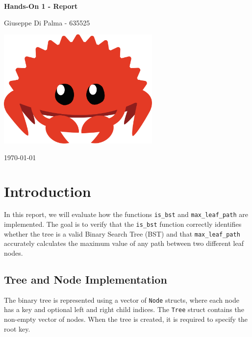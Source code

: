 \documentclass[a4paper,12pt]{article}
\begin{document}
\begin{titlepage}
    \centering
    \vspace*{1cm} 

    \Huge 
    \textbf{Hands-On 1 - Report} 

    \vspace{0.5cm} 

    \Large 
    Giuseppe Di Palma - 635525

    \vfill 

    \includegraphics[width=0.6\textwidth]{images/Cuddlyferris.png} 

    \vfill

    \Large 
    \today 
\end{titlepage}

\newpage

\section{Introduction}
In this report, we will evaluate how the functions \texttt{is\_bst} and \texttt{max\_leaf\_path} are implemented. 
The goal is to verify that the \texttt{is\_bst} function correctly identifies whether the tree is a valid Binary Search Tree (BST) and that \texttt{max\_leaf\_path} accurately calculates the maximum value of any path between two different leaf nodes.

\subsection{Tree and Node Implementation}
The binary tree is represented using a vector of \texttt{Node} structs, where each node has a key and optional left and right child indices. The \texttt{Tree} struct contains the non-empty vector of nodes. When the tree is created, it is required to specify the root key.
\end{document}
